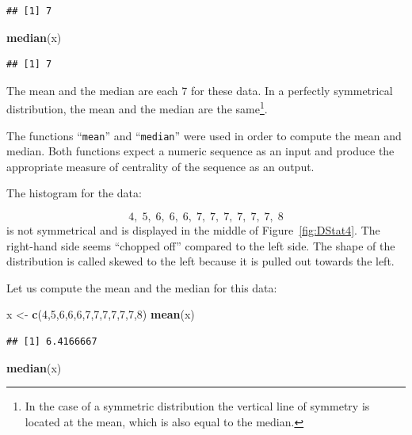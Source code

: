 \documentclass[]{krantz}
\makeatletter
\newenvironment{Shaded}{\begin{snugshade}}{\end{snugshade}}
\newcommand{\DecValTok}[1]{\textcolor[rgb]{0.00,0.00,0.81}{#1}}
\newcommand{\KeywordTok}[1]{\textcolor[rgb]{0.13,0.29,0.53}{\textbf{#1}}}
\newcommand{\NormalTok}[1]{#1}
\newcommand{\StringTok}[1]{\textcolor[rgb]{0.31,0.60,0.02}{#1}}
\newenvironment{kframe}{%
\medskip{}
\setlength{\fboxsep}{.8em}
 \def\at@end@of@kframe{}%
 \ifinner\ifhmode%
  \def\at@end@of@kframe{\end{minipage}}%
  \begin{minipage}{\columnwidth}%
 \fi\fi%
 \def\FrameCommand##1{\hskip\@totalleftmargin \hskip-\fboxsep
 \colorbox{shadecolor}{##1}\hskip-\fboxsep
     \hskip-\linewidth \hskip-\@totalleftmargin \hskip\columnwidth}%
 \MakeFramed {\advance\hsize-\width
   \@totalleftmargin\z@ \linewidth\hsize
   \@setminipage}}%
 {\par\unskip\endMakeFramed%
 \at@end@of@kframe}
\renewenvironment{Shaded}{\begin{kframe}}{\end{kframe}}
\theoremstyle{definition}
\theoremstyle{definition}
\theoremstyle{definition}
\theoremstyle{remark}
\makeatother
\begin{document}
\begin{verbatim}
## [1] 7
\end{verbatim}

\begin{Shaded}
\begin{Highlighting}[]
\KeywordTok{median}\NormalTok{(x)}
\end{Highlighting}
\end{Shaded}

\begin{verbatim}
## [1] 7
\end{verbatim}

The mean and the median are each 7 for these data. In a perfectly
symmetrical distribution, the mean and the median are the same\footnote{In the case of a symmetric distribution the vertical line of
  symmetry is located at the mean, which is also equal to the median.}.

The functions ``\texttt{mean}'' and ``\texttt{median}'' were used in order to compute the
mean and median. Both functions expect a numeric sequence as an input
and produce the appropriate measure of centrality of the sequence as an
output.

The histogram for the data:

\[4,\;  5,\;  6,\;  6,\;  6,\;  7,\;  7,\;  7,\;  7,\;  7,\;  7,\;  8\]
is not symmetrical and is displayed in the middle of
Figure~\ref{fig:DStat4}. The right-hand side seems ``chopped
off'' compared to the left side. The shape of the distribution is called
skewed to the left because it is pulled out towards the left.

Let us compute the mean and the median for this data:

\begin{Shaded}
\begin{Highlighting}[]
\NormalTok{x <-}\StringTok{ }\KeywordTok{c}\NormalTok{(}\DecValTok{4}\NormalTok{,}\DecValTok{5}\NormalTok{,}\DecValTok{6}\NormalTok{,}\DecValTok{6}\NormalTok{,}\DecValTok{6}\NormalTok{,}\DecValTok{7}\NormalTok{,}\DecValTok{7}\NormalTok{,}\DecValTok{7}\NormalTok{,}\DecValTok{7}\NormalTok{,}\DecValTok{7}\NormalTok{,}\DecValTok{7}\NormalTok{,}\DecValTok{8}\NormalTok{)}
\KeywordTok{mean}\NormalTok{(x)}
\end{Highlighting}
\end{Shaded}

\begin{verbatim}
## [1] 6.4166667
\end{verbatim}

\begin{Shaded}
\begin{Highlighting}[]
\KeywordTok{median}\NormalTok{(x)}
\end{Highlighting}
\end{Shaded}
\end{document}
